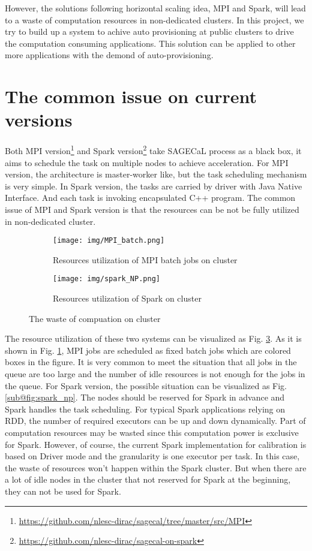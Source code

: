 \documentclass[sigchi]{acmart}
\begin{document}
However, the solutions following horizontal scaling idea, MPI and Spark, will lead to a waste of computation resources in non-dedicated clusters.
In this project, we try to build up a system to achive auto provisioning at public clusters to drive the computation consuming applications. This solution can be applied to other more applications with the demond of auto-provisioning.

\section{The common issue on current versions}
Both MPI version\footnote{\url{https://github.com/nlesc-dirac/sagecal/tree/master/src/MPI}} and Spark version\footnote{\url{https://github.com/nlesc-dirac/sagecal-on-spark}} take SAGECaL process as a black box, it aims to schedule the task on multiple nodes to achieve acceleration. 
For MPI version, the architecture is master-worker like, but the task scheduling mechanism is very simple. In Spark version, the tasks are carried by driver with Java Native Interface. And each task is invoking encapsulated C++ program.
The common issue of MPI and Spark version is that the resources can be not be fully utilized in non-dedicated cluster. 

\begin{figure}[h!]
  \begin{subfigure}[b]{0.45\textwidth}
      \texttt{[image: img/MPI\_batch.png]}
      \caption{Resources utilization of MPI batch jobs on cluster}
      \label{fig:MPI_batch}
  \end{subfigure}
  \begin{subfigure}[b]{0.45\textwidth}
      \texttt{[image: img/spark\_NP.png]}
      \caption{Resources utilization of Spark on cluster}
      \label{fig:spark_np}
  \end{subfigure}
  \caption{The waste of compuation on cluster}\label{fig:waste_cluster}
\end{figure}
The resource utilization of these two systems can be visualized as Fig. \ref{fig:waste_cluster}. As it is shown in Fig. \ref{fig:MPI_batch}, MPI jobs are scheduled as fixed batch jobs which are colored boxes in the figure. It is very common to meet the situation that all jobs in the queue are too large and the number of idle resources is not enough for the jobs in the queue. 
For Spark version, the possible situation can be visualized as Fig. \ref{sub@fig:spark_np}. The nodes should be reserved for Spark in advance and Spark handles the task scheduling. For typical Spark applications relying on RDD, the number of required executors can be up and down dynamically. Part of computation resources may be wasted since this computation power is exclusive for Spark.
However, of course, the current Spark implementation for calibration is based on Driver mode and the granularity is one executor per task. In this case, the waste of resources won't happen within the Spark cluster. But when there are a lot of idle nodes in the cluster that not reserved for Spark at the beginning, they can not be used for Spark. 
\end{document}
